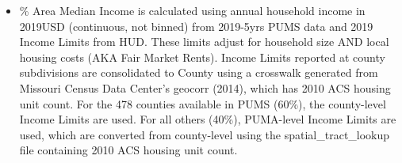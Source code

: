 \begin{itemize}
\item \% Area Median Income is calculated using annual household income in 2019USD (continuous, not binned) from 2019-5yrs PUMS data and 2019 Income Limits from HUD. These limits adjust for household size AND local housing costs (AKA Fair Market Rents). Income Limits reported at county subdivisions are consolidated to County using a crosswalk generated from Missouri Census Data Center's geocorr (2014), which has 2010 ACS housing unit count. For the 478 counties available in PUMS (60\%), the county-level Income Limits are used. For all others (40\%), PUMA-level Income Limits are used, which are converted from county-level using the spatial\_tract\_lookup file containing 2010 ACS housing unit count.
\end{itemize}

